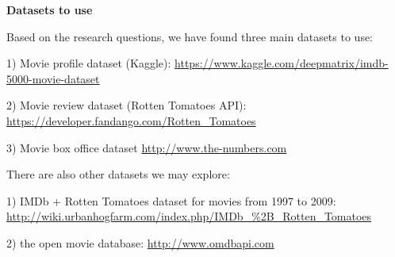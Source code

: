 \documentclass[twoside,10.5pt]{article}%
\begin{document}
\textbf{Datasets to use}

Based on the research questions, we have found three main datasets to use:

1) Movie profile dataset (Kaggle):
\newline \url{https://www.kaggle.com/deepmatrix/imdb-5000-movie-dataset}

2) Movie review dataset (Rotten Tomatoes API):
\newline \url{https://developer.fandango.com/Rotten_Tomatoes}

3) Movie box office dataset
\newline \url{http://www.the-numbers.com}

There are also other datasets we may explore:

1) IMDb + Rotten Tomatoes dataset for movies from 1997 to 2009:
\newline \url{http://wiki.urbanhogfarm.com/index.php/IMDb_%2B_Rotten_Tomatoes}

2) the open movie database:
\newline \url{http://www.omdbapi.com}
\end{document}
